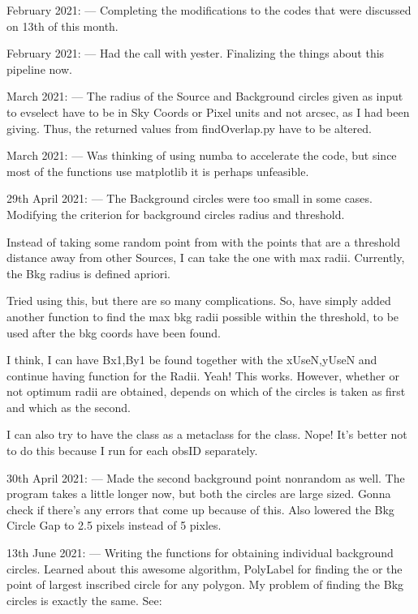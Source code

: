 \documentclass[letterpaper,10pt,english]{sphinxmanual}
\begin{document}
 February 2021:
—
Completing the modifications to the codes that were discussed on 13th of this month.

 February 2021:
—
Had the call with  yester. Finalizing the things about this pipeline now.

 March 2021:
—
The radius of the Source and Background circles given as input to evselect have to be in Sky Coords
or Pixel units and not arcsec, as I had been giving. Thus, the returned values from findOverlap.py
have to be altered.

 March 2021:
—
Was thinking of using numba to accelerate the code, but since most of the functions
use matplotlib it is perhaps unfeasible.

\sphinxAtStartPar
29th April 2021:
—
The Background circles were too small in some cases.
Modifying the criterion for background circles radius and threshold.

\sphinxAtStartPar
Instead of taking some random point from with the points that are a threshold distance
away from other Sources, I can take the one with max radii. Currently, the Bkg radius is defined a\sphinxhyphen{}priori.

\sphinxAtStartPar
Tried using this, but there are so many complications.
So, have simply added another function to find the max bkg radii possible within the threshold,
to be used after the bkg coords have been found.

\sphinxAtStartPar
I think, I can have Bx1,By1 be found together with the xUseN,yUseN and continue having 
function for the Radii.
Yeah! This works. However, whether or not optimum radii are obtained, depends on which of the circles
is taken as first and which as the second.

\sphinxAtStartPar
I can also try to have the  class as a meta\sphinxhyphen{}class for the  class.
Nope! It’s better not to do this because I run  for each obsID separately.

\sphinxAtStartPar
30th April 2021:
—
Made the second background point non\sphinxhyphen{}random as well.
The program takes a little longer now, but both the circles are large sized.
Gonna check if there’s any errors that come up because of this.
Also lowered the Bkg Circle Gap to 2.5 pixels instead of 5 pixles.

\sphinxAtStartPar
13th June 2021:
—
Writing the functions for obtaining individual background circles.
Learned about this awesome algorithm, PolyLabel for finding the 
or the point of largest inscribed circle for any polygon. My problem of finding the Bkg
circles is exactly the same.
See: 
\end{document}
